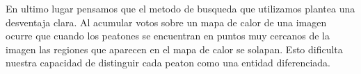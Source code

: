 \documentclass[a4paper,12pt]{article}
\begin{document}
En ultimo lugar pensamos que el metodo de busqueda que utilizamos plantea una desventaja clara. Al acumular votos sobre un mapa de calor de una imagen ocurre que cuando los peatones se encuentran en puntos muy cercanos de la imagen las regiones que aparecen en el mapa de calor se solapan. Esto dificulta nuestra capacidad de
distinguir cada peaton como una entidad diferenciada.

\normalsize


%
%
\end{document}

